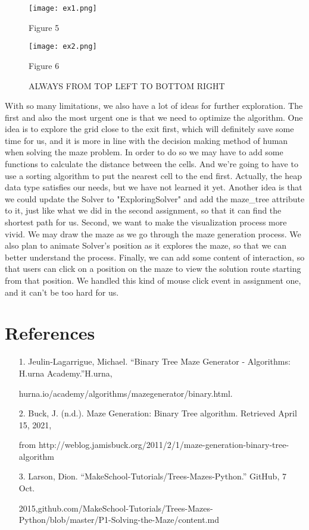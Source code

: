 \documentclass[fontsize=11pt]{article}
\begin{document}
\begin{figure}[ht]
\begin{minipage}{0.48\linewidth}
\centerline{\texttt{[image: ex1.png]}}
\centerline{Figure 5}
\end{minipage}
\qquad
\begin{minipage}{0.48\linewidth}
\centerline{\texttt{[image: ex2.png]}}
\centerline{Figure 6}
\end{minipage}
\caption*{ALWAYS FROM TOP LEFT TO BOTTOM RIGHT}
\end{figure}

With so many limitations, we also have a lot of ideas for further exploration. The first and also the most urgent one is that we need to optimize the algorithm. One idea is to explore the grid close to the exit first, which will definitely save some time for us, and it is more in line with the decision making method of human when solving the maze problem. In order to do so we may have to add some functions to calculate the distance between the cells. And we're going to have to use a sorting algorithm to put the nearest cell to the end first. Actually, the heap data type satisfies our needs, but we have not learned it yet. Another idea is that we could update the Solver to "ExploringSolver" and add the maze\_tree attribute to it, just like what we did in the second assignment, so that it can find the shortest path for us. Second, we want to make the visualization process more vivid. We may draw the maze as we go through the maze generation process. We also plan to animate Solver's position as it explores the maze, so that we can better understand the process. Finally, we can add some content of interaction, so that users can click on a position on the maze to view the solution route starting from that position. We handled this kind of mouse click event in assignment one, and it can’t be too hard for us.



\section*{References}
\begin{itemize}
\item[1.] Jeulin-Lagarrigue, Michael. “Binary Tree Maze Generator - Algorithms: H.urna Academy.”H.urna,

hurna.io/academy/algorithms/mazegenerator/binary.html.


\item[2.] Buck, J. (n.d.). Maze Generation: Binary Tree algorithm. Retrieved April 15, 2021,

from http://weblog.jamisbuck.org/2011/2/1/maze-generation-binary-tree-algorithm

\item[3.]Larson, Dion.  “MakeSchool-Tutorials/Trees-Mazes-Python.” GitHub, 7 Oct.

2015,github.com/MakeSchool-Tutorials/Trees-Mazes-Python/blob/master/P1-Solving-the-Maze/content.md
\end{itemize}
\end{document}
